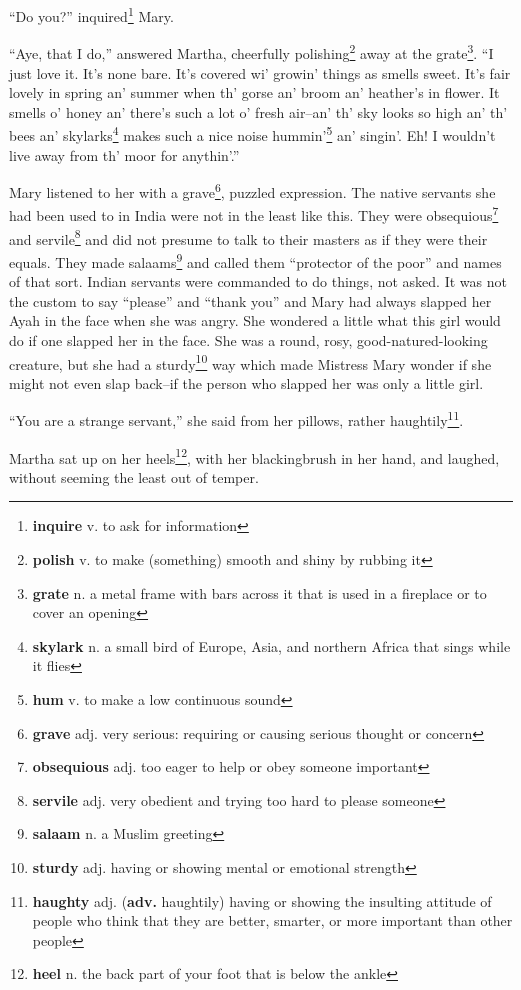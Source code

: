 ``Do you?'' inquired\footnote{\textbf{inquire} v. to ask for information} Mary.

``Aye, that I do,'' answered Martha, cheerfully polishing\footnote{\textbf{polish} v. to make (something) smooth and shiny by rubbing it} away at the grate\footnote{\textbf{grate} n. a metal frame with bars across it that is used in a fireplace or to cover an opening}. ``I just love it. It's none bare. It's covered wi' growin' things as smells sweet. It's fair lovely in spring an' summer when th' gorse an' broom an' heather's in flower. It smells o' honey an' there's such a lot o' fresh air--an' th' sky looks so high an' th' bees an' skylarks\footnote{\textbf{skylark} n. a small bird of Europe, Asia, and northern Africa that sings while it flies} makes such a nice noise hummin'\footnote{\textbf{hum} v. to make a low continuous sound} an' singin'. Eh! I wouldn't live away from th' moor for anythin'.''

Mary listened to her with a grave\footnote{\textbf{grave} adj. very serious: requiring or causing serious thought or concern}, puzzled expression. The native servants she had been used to in India were not in the least like this. They were obsequious\footnote{\textbf{obsequious} adj. too eager to help or obey someone important} and servile\footnote{\textbf{servile} adj. very obedient and trying too hard to please someone} and did not presume to talk to their masters as if they were their equals. They made salaams\footnote{\textbf{salaam} n. a Muslim greeting} and called them ``protector of the poor'' and names of that sort. Indian servants were commanded to do things, not asked. It was not the custom to say ``please'' and ``thank you'' and Mary had always slapped her Ayah in the face when she was angry. She wondered a little what this girl would do if one slapped her in the face. She was a round, rosy, good-natured-looking creature, but she had a sturdy\footnote{\textbf{sturdy} adj. having or showing mental or emotional strength} way which made Mistress Mary wonder if she might not even slap back--if the person who slapped her was only a little girl.

``You are a strange servant,'' she said from her pillows, rather haughtily\footnote{\textbf{haughty} adj. (\textbf{adv.} haughtily) having or showing the insulting attitude of people who think that they are better, smarter, or more important than other people}.

Martha sat up on her heels\footnote{\textbf{heel} n. the back part of your foot that is below the ankle}, with her blackingbrush in her hand, and laughed, without seeming the least out of temper.

